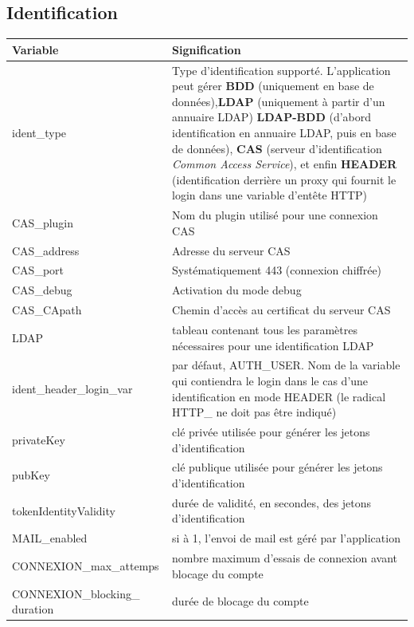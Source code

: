 \subsection{Identification}\label{paramident}
\begin{longtable}{|p{5cm}|p{8cm}|}
\hline
\textbf{Variable} & \textbf{Signification} \\
\hline
\endhead
\hline
\endfoot
\endlastfoot
ident\_type & Type d'identification supporté. L'application peut gérer \textbf{BDD} (uniquement en base de données),\textbf{LDAP} (uniquement à partir d'un annuaire LDAP) \textbf{LDAP-BDD} (d'abord identification en annuaire LDAP, puis en base de données), \textbf{CAS} (serveur d'identification \textit{Common Access Service}), et enfin \textbf{HEADER} (identification derrière un proxy qui fournit le login dans une variable d'entête HTTP)\\
CAS\_plugin & Nom du plugin utilisé pour une connexion CAS \\
CAS\_address & Adresse du serveur CAS\\
CAS\_port & Systématiquement 443 (connexion chiffrée)\\
CAS\_debug & Activation du mode debug \\
CAS\_CApath & Chemin d'accès au certificat du serveur CAS \\
LDAP & tableau contenant tous les paramètres nécessaires pour une identification LDAP \\
ident\_header\_login\_var & par défaut, AUTH\_USER. Nom de la variable qui contiendra le login dans le cas d'une identification en mode HEADER (le radical HTTP\_  ne doit pas être indiqué) \\

privateKey & clé privée utilisée pour générer les jetons d'identification \\

pubKey & clé publique utilisée pour générer les jetons d'identification \\

tokenIdentityValidity & durée de validité, en secondes, des jetons d'identification\\

MAIL\_enabled & si à 1, l'envoi de mail est géré par l'application \\

CONNEXION\_max\_attemps & nombre maximum d'essais de connexion avant blocage du compte \\

CONNEXION\_blocking\_ duration & durée de blocage du compte \\


\end{longtable}
